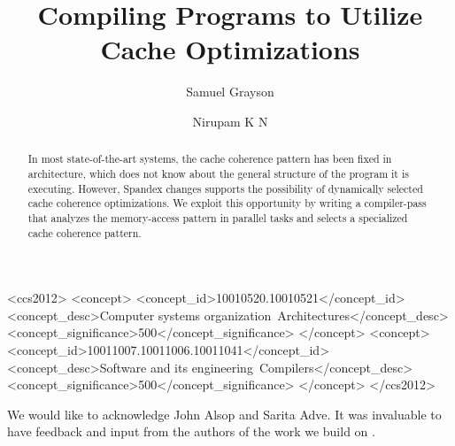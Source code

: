 \documentclass[sigconf,review,screen]{acmart}
\begin{document}
\title{Compiling Programs to Utilize Cache Optimizations}

\author{Samuel Grayson}

\author{Nirupam K N}

\renewcommand\footnotetextcopyrightpermission[1]{} %

\newcommand{\todo}[1]{\textcolor{red}{#1}}

\begin{abstract}
In most state-of-the-art systems, the cache coherence pattern has been fixed in architecture, which does not know about the general structure of the program it is executing.
However, Spandex changes supports the possibility of dynamically selected cache coherence optimizations.
We exploit this opportunity by writing a compiler-pass that analyzes the memory-access pattern in parallel tasks and selects a specialized cache coherence pattern.
\end{abstract}

\begin{CCSXML}
<ccs2012>
<concept>
<concept_id>10010520.10010521</concept_id>
<concept_desc>Computer systems organization~Architectures</concept_desc>
<concept_significance>500</concept_significance>
</concept>
<concept>
<concept_id>10011007.10011006.10011041</concept_id>
<concept_desc>Software and its engineering~Compilers</concept_desc>
<concept_significance>500</concept_significance>
</concept>
</ccs2012>
\end{CCSXML}


\maketitle









\begin{acks}
We would like to acknowledge John Alsop and Sarita Adve. It was invaluable to have feedback and input from the authors of the work we build on \cite{Spandex,dynamic_cache_coherence}.
\end{acks}




\end{document}
